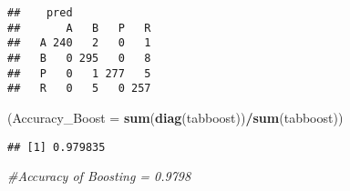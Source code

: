 \documentclass[]{article}
\newenvironment{Shaded}{\begin{snugshade}}{\end{snugshade}}
\newcommand{\CommentTok}[1]{\textcolor[rgb]{0.56,0.35,0.01}{\textit{#1}}}
\newcommand{\DataTypeTok}[1]{\textcolor[rgb]{0.13,0.29,0.53}{#1}}
\newcommand{\KeywordTok}[1]{\textcolor[rgb]{0.13,0.29,0.53}{\textbf{#1}}}
\newcommand{\NormalTok}[1]{#1}
\newcommand{\OperatorTok}[1]{\textcolor[rgb]{0.81,0.36,0.00}{\textbf{#1}}}
\begin{document}
\begin{verbatim}
##    pred
##       A   B   P   R
##   A 240   2   0   1
##   B   0 295   0   8
##   P   0   1 277   5
##   R   0   5   0 257
\end{verbatim}

\begin{Shaded}
\begin{Highlighting}[]
\NormalTok{(}\DataTypeTok{Accuracy_Boost =} \KeywordTok{sum}\NormalTok{(}\KeywordTok{diag}\NormalTok{(tabboost))}\OperatorTok{/}\KeywordTok{sum}\NormalTok{(tabboost))}
\end{Highlighting}
\end{Shaded}

\begin{verbatim}
## [1] 0.979835
\end{verbatim}

\begin{Shaded}
\begin{Highlighting}[]
\CommentTok{#Accuracy of Boosting = 0.9798}
\end{Highlighting}
\end{Shaded}
\end{document}
